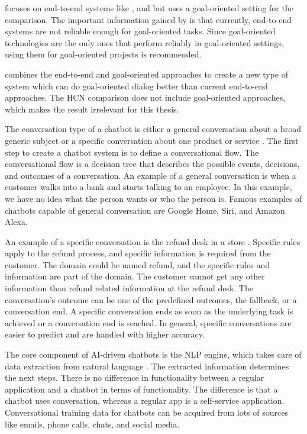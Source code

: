 \citet{bordes2016learning} focuses on end-to-end systems like \citet{evaluateChatbotsShawar2007}, and \citet{williams2017hybrid} but uses a goal-oriented setting for the comparison.
The important information gained by \citet{bordes2016learning} is that currently, end-to-end systems are not reliable enough for goal-oriented tasks.
Since goal-oriented technologies are the only ones that perform reliably in goal-oriented settings, using them for goal-oriented projects is recommended.

\citet{williams2017hybrid} combines the end-to-end and goal-oriented approaches to create a new type of system which can do goal-oriented dialog better than current end-to-end approaches. 
The HCN comparison does not include goal-oriented approaches, which makes the result irrelevant for this thesis.

The conversation type of a chatbot is either a general conversation about a broad generic subject or a specific conversation about one product or service \citet{singhbuilding}.
The first step to create a chatbot system is to define a conversational flow.
The conversational flow is a decision tree that describes the possible events, decisions, and outcomes of a conversation.
An example of a general conversation is when a customer walks into a bank and starts talking to an employee.
In this example, we have no idea what the person wants or who the person is.
Famous examples of chatbots capable of general conversation are Google Home, Siri, and Amazon Alexa.

An example of a specific conversation is the refund desk in a store \cite{singhbuilding}. 
Specific rules apply to the refund process, and specific information is required from the customer.
The domain could be named refund, and the specific rules and information are part of the domain. 
The customer cannot get any other information than refund related information at the refund desk. 
The conversation's outcome can be one of the predefined outcomes, the fallback, or a conversation end. 
A specific conversation ends as soon as the underlying task is achieved or a conversation end is reached. 
In general, specific conversations are easier to predict and are handled with higher accuracy.

The core component of AI-driven chatbots is the NLP engine, which takes care of data extraction from natural language \cite{singhbuilding}.
The extracted information determines the next steps.
There is no difference in functionality between a regular application and a chatbot in terms of functionality. 
The difference is that a chatbot uses conversation, whereas a regular app is a self-service application. 
Conversational training data for chatbots can be acquired from lots of sources like emails, phone calls, chats, and social media.

